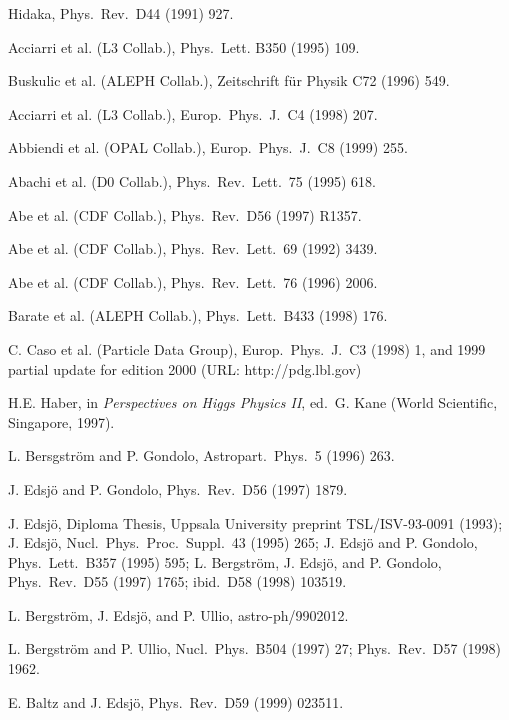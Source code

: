 \begin{thebibliography}{99}
 Hidaka, Phys.\ Rev.\ D44 (1991) 927.
  
 Acciarri et al. (L3 Collab.), Phys.\ Lett. B350 (1995)
  109.
  
 Buskulic et al. (ALEPH Collab.), Zeitschrift f\"ur Physik
  C72 (1996) 549.
  
 Acciarri et al. (L3 Collab.), Europ.\ Phys.\ J.\ C4 (1998)
  207.
  
 Abbiendi et al. (OPAL Collab.), Europ.\ Phys.\ J.\ C8
  (1999) 255.
  
 Abachi et al. (D0 Collab.), Phys.\ Rev.\ Lett.\ 75 (1995)
  618.

 Abe et al. (CDF Collab.), Phys.\ Rev.\ D56 (1997) R1357.
  
 Abe et al. (CDF Collab.), Phys.\ Rev.\ Lett.\ 69 (1992) 3439.
  
 Abe et al. (CDF Collab.), Phys.\ Rev.\ Lett.\ 76 (1996) 2006.
  
 Barate et al. (ALEPH Collab.), Phys.\ Lett.\ B433 (1998)
  176.
  
 C. Caso et al. (Particle Data Group), Europ.\ Phys.\ J.\ C3
  (1998) 1, and 1999 partial update for edition 2000 (URL: http://pdg.lbl.gov)

 H.E. Haber, in {\it Perspectives on Higgs Physics II}, ed.\
  G. Kane (World Scientific, Singapore, 1997). 
  
 L. Bersgstr\"om and P. Gondolo, Astropart.\ Phys.\ 5
  (1996) 263.

 J. Edsj\"o and P. Gondolo, Phys.\ Rev.\ D56 (1997) 1879.
  
 J. Edsj\"o, Diploma Thesis, Uppsala University preprint
  TSL/ISV-93-0091 (1993); J. Edsj\"o, Nucl.\ Phys.\ Proc.\ Suppl.\ 43 (1995)
  265; J. Edsj\"o and P. Gondolo, Phys.\ Lett.\ B357 (1995) 595; L.
  Bergstr\"om, J. Edsj\"o, and P. Gondolo, Phys.\ Rev.\ D55 (1997) 1765;
  ibid.\ D58 (1998) 103519.

 L. Bergstr\"om, J. Edsj\"o, and P. Ullio,
  astro-ph/9902012. 

 L. Bergstr\"om and P. Ullio, Nucl.\ Phys.\ B504 (1997)
  27; Phys.\ Rev.\ D57 (1998) 1962.
  
 E. Baltz and J. Edsj\"o, Phys.\ Rev.\ D59 (1999) 023511.


\end{thebibliography}
